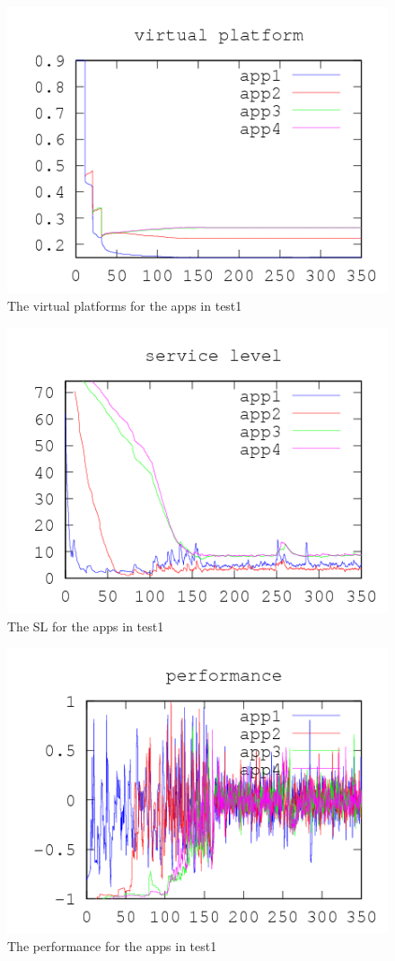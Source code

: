 \documentclass[nobiblatex]{LTHthesis}
\begin{document}
\begin{figure}[!H]
  \centering
  \includegraphics{"tools/plot/logs/test1/vp"}
  \caption{The virtual platforms for the apps in test1}
  \label{fig:test1_vp}
\end{figure}

\begin{figure}[!H]
  \centering
  \includegraphics{"tools/plot/logs/test1/sl"}
  \caption{The SL for the apps in test1}
  \label{fig:test1_sl}
\end{figure}

\begin{figure}[!H]
  \centering
  \includegraphics{"tools/plot/logs/test1/f"}
  \caption{The performance for the apps in test1}
  \label{fig:test1_f}
\end{figure}
\end{document}
